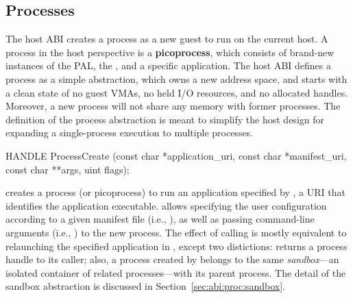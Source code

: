 \subsection{Processes}
\label{sec:abi:proc}


The host ABI creates a process as a new guest to run on the current host.
A process in the host perspective is a {\bf picoprocess}, which consists of brand-new instances
of the PAL, the \libos{}, and a specific application.
The host ABI defines a process
as a simple abstraction, which owns a new address space, and starts with a clean state of no guest VMAs, no held I/O resources, and no allocated handles.
Moreover, a new process will not share any memory with former processes.
The definition of the process abstraction
is meant to simplify the host design for expanding a single-process execution to multiple processes.








\begin{paldef}
HANDLE ProcessCreate (const char *application_uri,
                      const char *manifest_uri,
                      const char **args, uint flags);
\end{paldef}


 creates a process (or picoprocess) to run an application specified by
, a URI that identifies the application executable.
 allows specifying the user configuration
according to a given manifest file (i.e., ), as well as passing command-line arguments (i.e., ) to the new process.
The effect of calling  is mostly equivalent to
relaunching the specified application in \graphene{},
except two distictions:  returns a process handle to its caller;
also, a process created by  belongs to the same {\em sandbox}---an isolated container of related processes---with its parent process.
The detail of the sandbox abstraction is discussed in Section~\ref{sec:abi:proc:sandbox}.




